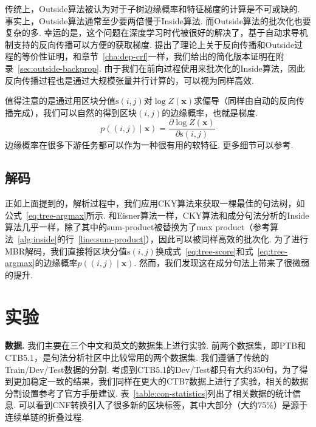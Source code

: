 传统上，Outside算法被认为对于子树边缘概率和特征梯度的计算是不可或缺的.
事实上，Outside算法通常至少要两倍慢于Inside算法.
而Outside算法的批次化也要复杂的多.
幸运的是，这个问题在深度学习时代被很好的解决了，基于自动求导机制支持的反向传播可以方便的获取梯度.
\citep{eisner-2016-inside}提出了理论上关于反向传播和Outside过程的等价性证明，和章节~\ref{cha:dep-crf}一样，我们给出的简化版本证明在附录~\ref{sec:outside-backprop}.
由于我们在前向过程使用来批次化的Inside算法，因此反向传播过程也是通过大规模张量并行计算的，可以视为同样高效.

值得注意的是通过用区块分值$\mathrm{s}(i,j)$对$\log Z(\boldsymbol{x})$求偏导（同样由自动的反向传播完成），我们可以自然的得到区块$(i,j)$的边缘概率，也就是梯度.
\begin{equation} \label{eq:con-partial-derivative}
  p((i, j)\mid\boldsymbol{x}) = \frac{\partial \log Z(\boldsymbol{x})}{\partial \mathrm{s}(i, j)}
\end{equation}
边缘概率在很多下游任务都可以作为一种很有用的软特征.
更多细节可以参考\citep{eisner-2016-inside}.

\subsection{解码}

正如上面提到的，解析过程中，我们应用CKY算法来获取一棵最佳的句法树，如公式~\ref{eq:tree-argmax}所示.
和Eisner算法一样，CKY算法和成分句法分析的Inside算法几乎一样，除了其中的sum-product被替换为了max product（参考算法~\ref{alg:inside}的行~\ref{line:sum-product}），因此可以被同样高效的批次化.
为了进行MBR解码，我们直接将区块分值$\mathrm{s}(i,j)$换成式~\ref{eq:tree-score}和式~\ref{eq:tree-argmax}的边缘概率$p((i,j)\mid\boldsymbol{x})$.
然而，我们发现这在成分句法上带来了很微弱的提升.



\section{实验}
\label{sec:con-experiments}
\noindent\textbf{数据.}
我们主要在三个中文和英文的数据集上进行实验.
前两个数据集，即PTB和CTB5.1，是句法分析社区中比较常用的两个数据集.
我们遵循了传统的Train/Dev/Test数据的分割.
考虑到CTB5.1的Dev/Test都只有大约350句，为了得到更加稳定一致的结果，我们同样在更大的CTB7数据上进行了实验，相关的数据分割设置参考了官方手册建议.
表~\ref{table:con-statistics}列出了相关数据的统计信息.
可以看到CNF转换引入了很多新的区块标签，其中大部分（大约75\%）是源于连续单链的折叠过程.

